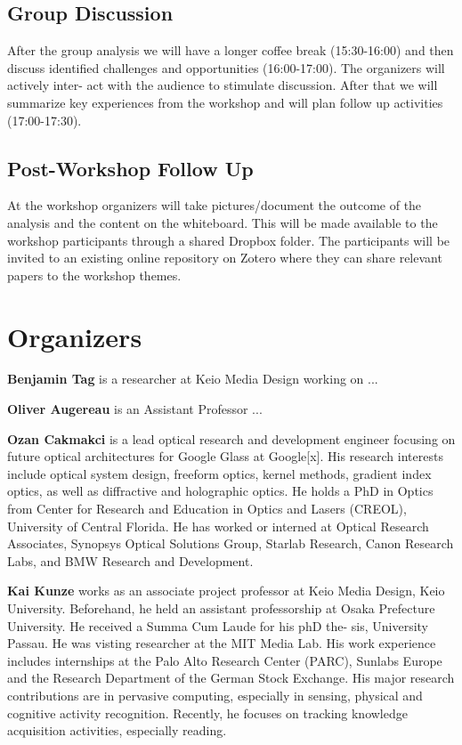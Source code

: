 \documentclass{sigchi-ext}
\begin{document}
\subsection{Group Discussion}
After the group analysis we will have a longer coffee break (15:30-16:00) and then discuss identified challenges and opportunities (16:00-17:00). The organizers will actively inter- act with the audience to stimulate discussion. After that we will summarize key experiences from the workshop and will plan follow up activities (17:00-17:30).

\subsection{Post-Workshop Follow Up}
At the workshop organizers will take pictures/document the outcome of the analysis and the content on the whiteboard. This will be made available to the workshop participants through a shared Dropbox folder. The participants will be invited to an existing online repository on Zotero where they can share relevant papers to the workshop themes.

\section{Organizers}

{\bf Benjamin Tag} is a researcher at Keio Media Design working on ...


{\bf Oliver Augereau} is an Assistant Professor  ...

{\bf Ozan Cakmakci} is a lead optical research and development engineer focusing on future optical architectures for Google Glass at Google[x]. His research interests include optical system design, freeform optics, kernel methods, gradient index optics, as well as diffractive and holographic optics. He holds a PhD in Optics from Center for Research and Education in Optics and Lasers (CREOL), University of Central Florida. He has worked or interned at Optical Research Associates, Synopsys Optical Solutions Group, Starlab Research, Canon Research Labs, and BMW Research and Development.


{\bf Kai Kunze} works as an associate project professor at Keio Media Design, Keio University. Beforehand, he held an assistant professorship at Osaka Prefecture University. He received a Summa Cum Laude for his phD the- sis, University Passau. He was visting researcher at the MIT Media Lab. His work experience includes internships at the Palo Alto Research Center (PARC), Sunlabs Europe and the Research Department of the German Stock Exchange. His major research contributions are in pervasive computing, especially in sensing, physical and cognitive activity recognition. Recently, he focuses on tracking knowledge acquisition activities, especially reading.
\end{document}
